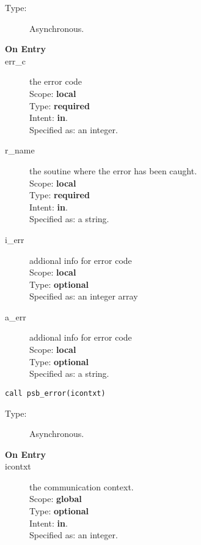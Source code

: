 \begin{description}
\item[Type:] Asynchronous.
\item[\bf On Entry]
\item[err\_c] the error code\\
Scope: {\bf local} \\
Type: {\bf required}\\
Intent: {\bf in}.\\
Specified as: an integer.
\item[r\_name] the soutine where the error has been caught.\\
Scope: {\bf local} \\
Type: {\bf required}\\
Intent: {\bf in}.\\
Specified as: a string.\\
\item[i\_err] addional info for error code\\
Scope: {\bf local} \\
Type: {\bf optional}\\
Specified as: an integer array\\
\item[a\_err] addional info for error code\\
Scope: {\bf local} \\
Type: {\bf optional}\\
Specified as: a string.\\
\end{description}

\clearpage{}

\begin{lstlisting}
call psb_error(icontxt)
\end{lstlisting}

\begin{description}
\item[Type:] Asynchronous.
\item[\bf On Entry]
\item[icontxt] the communication context.\\
Scope: {\bf global} \\
Type: {\bf optional}\\
Intent: {\bf in}.\\
Specified as: an integer.
\end{description}



